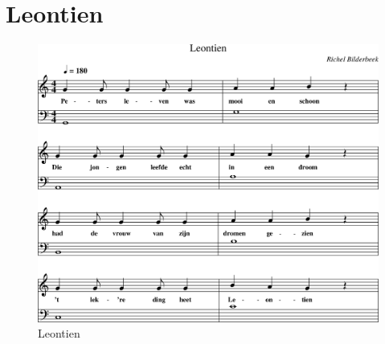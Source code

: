\section{Leontien}



\begin{figure}[!htbp]
  \includegraphics[width=\textwidth,height=\textheight,keepaspectratio]{../songs/06_leontien.png}
  \caption{Leontien}
  \label{fig:06_leontien}
\end{figure}
